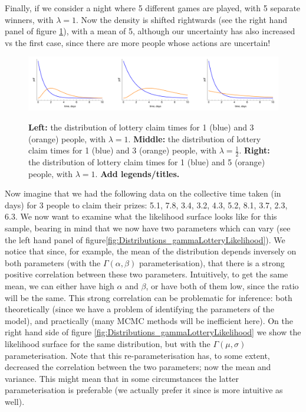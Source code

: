 \documentclass[11pt,fullpage]{book}
\begin{document}
Finally, if we consider a night where 5 different games are played, with 5 separate winners, with $\lambda=1$. Now the density is shifted rightwards (see the right hand panel of figure \ref{fig:Distributions_gammaLottery}), with a mean of 5, although our uncertainty has also increased vs the first case, since there are more people whose actions are uncertain! 

\begin{figure}
\centering
\scalebox{0.3} 
{\includegraphics{Distributions_gammaLottery.pdf}}
\caption{\textbf{Left:} the distribution of lottery claim times for 1 (blue) and 3 (orange) people, with $\lambda=1$. \textbf{Middle:} the distribution of lottery claim times for 1 (blue) and 3 (orange) people, with $\lambda=\frac{1}{2}$. \textbf{Right:} the distribution of lottery claim times for 1 (blue) and 5 (orange) people, with $\lambda=1$. \textbf{Add legends/titles.}}\label{fig:Distributions_gammaLottery}
\end{figure}

Now imagine that we had the following data on the collective time taken (in days) for 3 people to claim their prizes: {5.1, 7.8, 3.4, 3.2, 4.3, 5.2, 8.1, 3.7, 2.3, 6.3}. We now want to examine what the likelihood surface looks like for this sample, bearing in mind that we now have two parameters which can vary (see the left hand panel of figure\ref{fig:Distributions_gammaLotteryLikelihood}). We notice that since, for example, the mean of the distribution depends inversely on both parameters (with the $\Gamma(\alpha,\beta)$ parameterisation), that there is a strong positive correlation between these two parameters. Intuitively, to get the same mean, we can either have high $\alpha$ and $\beta$, or have both of them low, since the ratio will be the same. This strong correlation can be problematic for inference: both theoretically (since we have a problem of identifying the parameters of the model), and practically (many MCMC methods will be inefficient here). On the right hand side of figure \ref{fig:Distributions_gammaLotteryLikelihood} we show the likelihood surface for the same distribution, but with the $\Gamma(\mu,\sigma)$ parameterisation. Note that this re-parameterisation has, to some extent, decreased the correlation between the two parameters; now the mean and variance. This might mean that in some circumstances the latter parameterisation is preferable (we actually prefer it since is more intuitive as well).
\end{document}
